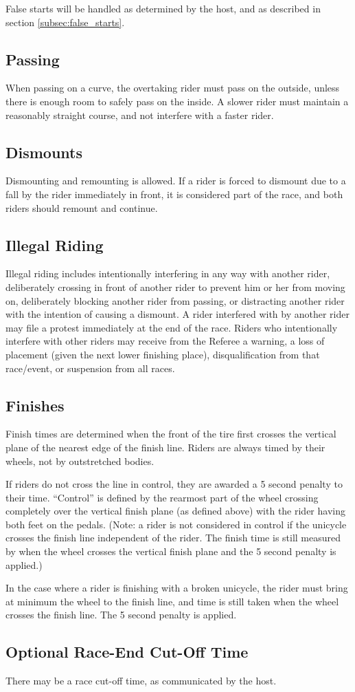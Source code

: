 False starts will be handled as determined by the host, and as described in section \ref{subsec:false_starts}.

\subsection{Passing}
When passing on a curve, the overtaking rider must pass on the outside, unless there is enough room to safely pass on the inside.
A slower rider must maintain a reasonably straight course, and not interfere with a faster rider.

\subsection{Dismounts}
Dismounting and remounting is allowed. 
If a rider is forced to dismount due to a fall by the rider immediately in front, it is considered part of the race, and both riders should remount and continue.

\subsection{Illegal Riding}
Illegal riding includes intentionally interfering in any way with another rider, deliberately crossing in front of another rider to prevent him or her from moving on, deliberately blocking another rider from passing, or distracting another rider with the intention of causing a dismount.
A rider interfered with by another rider may file a protest immediately at the end of the race.
Riders who intentionally interfere with other riders may receive from the Referee a warning, a loss of placement (given the next lower finishing place), disqualification from that race/event, or suspension from all races.

\subsection{Finishes}
Finish times are determined when the front of the tire first crosses the vertical plane of the nearest edge of the finish line. Riders are always timed by their wheels, not by outstretched bodies.

If riders do not cross the line in control, they are awarded a 5 second penalty to their time.
``Control'' is defined by the rearmost part of the wheel crossing completely over the vertical finish plane (as defined above) with the rider having both feet on the pedals.
(Note: a rider is not considered in control if the unicycle crosses the finish line independent of the rider.
The finish time is still measured by when the wheel crosses the vertical finish plane and the 5 second penalty is applied.)

In the case where a rider is finishing with a broken unicycle, the rider must bring at minimum the wheel to the finish line, and time is still taken when the wheel crosses the finish line.
The 5 second penalty is applied.

\subsection{Optional Race-End Cut-Off Time}

There may be a race cut-off time, as communicated by the host.
